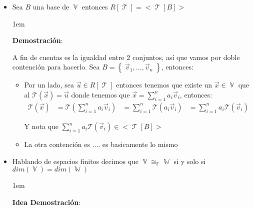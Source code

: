 \documentclass[12pt, fleqn]{article}                             %
\newenvironment{SmallIndentation}[1][0.75em]                    %
        {\begin{adjustwidth}{#1}{}\begin{footnotesize}}             %
        {\end{footnotesize}\end{adjustwidth}}                       %
\theoremstyle{break}                                            %
\DeclareMathOperator \GenericField {\mathbb{F}}                 %
\DeclareMathOperator \VectorSet    {\mathbb{V}}                 %
\DeclareMathOperator \SubVectorSet {\mathbb{W}}                 %
\DeclareMathOperator \LinealTransformation {\mathcal{T}}        %
\DeclareMathOperator \LinTrans {\mathcal{T}}                    %
\newcommand{\Set}[1]    {\left\{ \; #1 \; \right\}}             %
\newcommand{\Wrap}[1]    {\left( #1 \right)}                    %
\newcommand{\FnLinTrans}[1]{\mathcal{T}\Wrap{#1}}               %
\begin{document}
        \begin{itemize}
            \item 
                Sea $B$ una base de $\VectorSet$ entonces $R[\LinealTransformation] = <\LinTrans[B]>$ 

                \begin{SmallIndentation}[1em]
                    \textbf{Demostración}:
                    
                    A fin de cuentas es la igualdad entre 2 conjuntos, así que vamos por doble contención
                    para hacerlo. Sea $B = \Set{\vec v_1, \dots, \vec v_n}$, entonces:

                    \begin{itemize}
                        \item 
                            Por un lado, sea $\vec u \in R[\LinealTransformation]$ entonces
                            tenemos que existe un $\vec x \in \VectorSet$ que al $\FnLinTrans{\vec x} = \vec u$
                            donde tenemos que $\vec x = \sum_{i=1}^n a_i \vec v_i$, entonces:
                            \begin{align*}
                                \FnLinTrans{\vec x} 
                                    &= \FnLinTrans{\sum_{i=1}^n a_i \vec v_i} 
                                    &= \sum_{i=1}^n \FnLinTrans{a_i \vec v_i} 
                                    &= \sum_{i=1}^n a_i \FnLinTrans{\vec v_i} 
                            \end{align*}

                                Y nota que $\sum_{i=1}^n a_i \FnLinTrans{\vec v_i} \in <\LinTrans[B]>$ 

                       \item
                        La otra contención es .... es basicamente lo mismo

                    \end{itemize}

                \end{SmallIndentation}

            \item
                Hablando de espacios finitos decimos que
                $\VectorSet \cong_{\GenericField} \SubVectorSet$ si y solo si 
                $dim(\VectorSet) = dim(\SubVectorSet)$

                \begin{SmallIndentation}[1em]
                    \textbf{Idea Demostración}:


\end{SmallIndentation}
\end{itemize}
\end{document}
